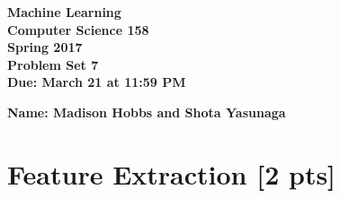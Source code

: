 \documentclass[11pt]{article}
\begin{document}
\newcommand{\Name}[1]{\noindent \textbf{Name:} #1 \\}
\newcommand{\pderiv}[2]{\frac{\partial #1}{\partial #2}}
\newcommand{\psderiv}[3]{\frac{\partial^2 #1}{\partial #2 \partial #3}}

\begin{center}
    \bf
    Machine Learning \\
    Computer Science 158 \\
    Spring 2017 \\
    \rm
    Problem Set 7\\
    Due:  March 21 at 11:59 PM \\
\end{center}
\noindent \textbf{Name: Madison Hobbs and Shota Yasunaga} \\


\section{Feature Extraction [2 pts]}
\end{document}
